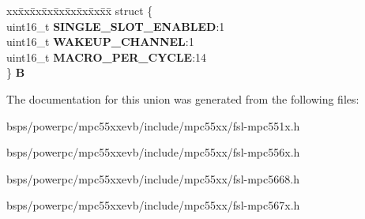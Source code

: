 \begin{DoxyCompactItemize}
\begin{tabbing}
\end{tabbing}\item 
\mbox{\label{unionuPCR10_a0951792e0a39054f8de4a363ca0f2a38}} 
\begin{tabbing}
xx\=xx\=xx\=xx\=xx\=xx\=xx\=xx\=xx\=\kill
struct \{\\
\>uint16\_t {\bfseries SINGLE\_SLOT\_ENABLED}:1\\
\>uint16\_t {\bfseries WAKEUP\_CHANNEL}:1\\
\>uint16\_t {\bfseries MACRO\_PER\_CYCLE}:14\\
\} {\bfseries B}\\

\end{tabbing}\end{DoxyCompactItemize}


The documentation for this union was generated from the following files\+:\begin{DoxyCompactItemize}
\item 
bsps/powerpc/mpc55xxevb/include/mpc55xx/fsl-\/mpc551x.\+h\item 
bsps/powerpc/mpc55xxevb/include/mpc55xx/fsl-\/mpc556x.\+h\item 
bsps/powerpc/mpc55xxevb/include/mpc55xx/fsl-\/mpc5668.\+h\item 
bsps/powerpc/mpc55xxevb/include/mpc55xx/fsl-\/mpc567x.\+h\end{DoxyCompactItemize}
